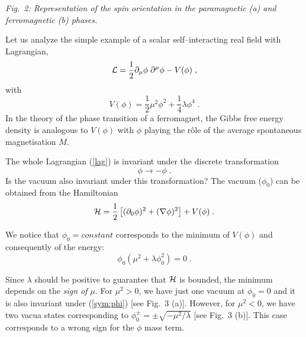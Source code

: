 \documentclass[12pt]{report}
\newcommand{\lag}{{\cal L}}
\newcommand{\del}{\partial}
\begin{document}
\begin{center}
\begin{minipage}[h]{12cm}
\begin{center}
{\it Fig.\ 2: Representation of the spin orientation in the paramagnetic
(a) and ferromagnetic (b) phases.}
\end{center}
\end{minipage}
\end{center}


Let us analyze the simple example of a scalar self--interacting real
field with Lagrangian,
\begin{equation}
\lag = \frac{1}{2} \del_\mu \phi \; \del^\mu \phi -  V(\phi) \; ,
\label{lag}
\end{equation}
with
\begin{equation}
V(\phi) = \frac{1}{2} \mu^2 \phi^2 + \frac{1}{4} \lambda \phi^4 \; .
\label{sca:pot}
\end{equation}
In the theory of the phase transition of a ferromagnet, the
Gibbs free energy density is analogous to $V(\phi)$ with  $\phi$
playing the r\^ole of the average spontaneous magnetisation $M$.

The whole Lagrangian (\ref{lag}) is invariant under the discrete 
transformation
\begin{equation}
\phi \to - \phi \; .
\label{sym:phi}
\end{equation}
Is the vacuum also invariant under this transformation? The
vacuum ($\phi_0$) can be obtained from the Hamiltonian
\[
{\cal H} = \frac{1}{2} \left[(\del_0 \phi)^2 + (\nabla \phi)^2 \right]
+ V(\phi) \; .
\]

We notice that $\phi_0 = constant$ corresponds to the minimum of $V(\phi)$
and consequently of the energy: 
\[
\phi_0 (\mu^2 + \lambda \phi_0^2) = 0 \; .
\]

Since $\lambda$ should be positive to guarantee that ${\cal H}$ is
bounded, the minimum depends on the {\it sign of $\mu$}. For $\mu^2
>0$, we have just one vacuum at $\phi_0 = 0$ and it is also invariant
under (\ref{sym:phi}) [see Fig.\ 3 (a)]. However, for $\mu^2 < 0$, we
have two vacua states corresponding to $\phi_0^\pm = \pm
\sqrt{-\mu^2/\lambda}$ [see Fig.\ 3 (b)]. This case corresponds to a
wrong sign for the $\phi$ mass term. 
\end{document}
